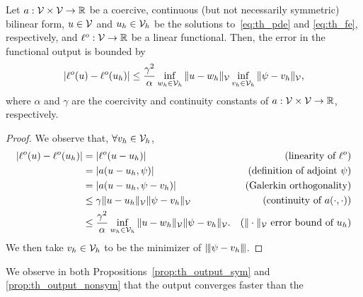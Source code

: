 \begin{proposition}
  \label{prop:th_output_nonsym}
  Let $a: \mathcal{V} \times \mathcal{V} \to \mathbb{R}$ be a coercive, continuous (but not necessarily symmetric) bilinear form, $u \in \mathcal{V}$ and $u_h \in \mathcal{V}_h$ be the solutions to~\eqref{eq:th_pde} and \eqref{eq:th_fe}, respectively, and $\ell^o: \mathcal{V} \to \mathbb{R}$ be a linear functional. Then, the error in the functional output is bounded by 
\begin{equation*}
  |\ell^o(u) - \ell^o(u_h)|
  \leq \frac{\gamma^2}{\alpha} \inf_{w_h \in \mathcal{V}_h} \| u - w_h \|_{\mathcal{V}} \inf_{v_h \in \mathcal{V}_h} \| \psi - v_h \|_{\mathcal{V}},
\end{equation*}
where $\alpha$ and $\gamma$ are the coercivity and continuity constants of $a : \mathcal{V} \times \mathcal{V} \to \mathbb{R}$, respectively.
\begin{proof}
  We observe that, $\forall v_h \in \mathcal{V}_h$, 
  \begin{align*}
    |\ell^o(u) - \ell^o(u_h)|
    &= |\ell^o(u - u_h)| & \text{(linearity of $\ell^o$)} \\
    &= |a(u-u_h,\psi)| & \text{(definition of adjoint $\psi$)} \\
    &= |a(u-u_h,\psi-v_h)| & \text{(Galerkin orthogonality)} \\
    &\leq \gamma \| u - u_h \|_{\mathcal{V}} \| \psi - v_h \|_{\mathcal{V}} & \text{(continuity of $a(\cdot,\cdot)$)} \\
    &\leq \frac{\gamma^2}{\alpha} \inf_{w_h \in \mathcal{V}_h} \| u - w_h \|_{\mathcal{V}} \| \psi - v_h \|_{\mathcal{V}}. & \text{($\| \cdot \|_{\mathcal{V}}$ error bound of $u_h$)}
  \end{align*}
  We then take $v_h \in \mathcal{V}_h$ to be the minimizer of $|\kern-1pt|\kern-1pt| \psi - v_h |\kern-1pt|\kern-1pt|$.
\end{proof}
\end{proposition}

\begin{remark}
  We observe in both Propositions~\ref{prop:th_output_sym} and \ref{prop:th_output_nonsym} that the output converges faster than the 
\end{remark}

